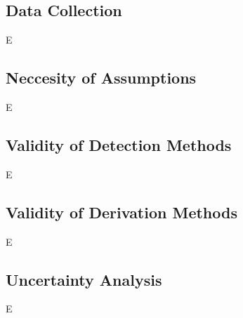 \subsection{Data Collection}
\label{ssec:B1}

E

\subsection{Neccesity of Assumptions}
\label{ssec:B2}

E

\subsection{Validity of Detection Methods}
\label{ssec:B5}

E

\subsection{Validity of Derivation Methods}
\label{ssec:B3}

E

\subsection{Uncertainty Analysis}
\label{ssec:B4}

E
